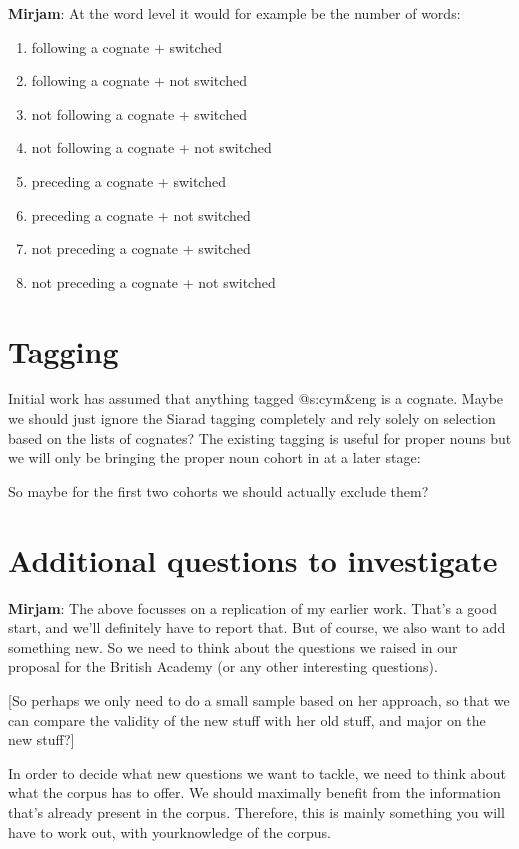 \documentclass[a4paper,10pt]{article}
\begin{document}
\textbf{Mirjam}: At the word level it would for example be the number of words:
\begin{enumerate}
\itemsep-0.4em 
\item following a cognate + switched
\item following a cognate + not switched
\item not following a cognate + switched
\item not following a cognate + not switched
\item preceding a cognate + switched
\item preceding a cognate + not switched
\item not preceding a cognate + switched
\item not preceding a cognate + not switched
\end{enumerate}


\section{Tagging}

Initial work has assumed that anything tagged @s:cym\&eng is a cognate.  Maybe we should just ignore the Siarad tagging completely and rely solely on selection based on the lists of cognates?  The existing tagging is useful for proper nouns but we will only be bringing the proper noun cohort in at a later stage:

So maybe for the first two cohorts we should actually exclude them?


\section{Additional questions to investigate}

\textbf{Mirjam}: The above focusses on a replication of my earlier work. That's a good start, and we'll definitely have to report that. But of course, we also want to add something new. So we need to think about the questions we raised in our proposal for the British Academy (or any other interesting questions).

[So perhaps we only need to do a small sample based on her approach, so that we can compare the validity of the new stuff 
with her old stuff, and major on the new stuff?]

In order to decide what new questions we want to tackle, we need to think about what the corpus has to offer. We should maximally benefit from the information that's already present in the corpus. Therefore, this is mainly something you will have to work out, with yourknowledge of the corpus.
\end{document}
